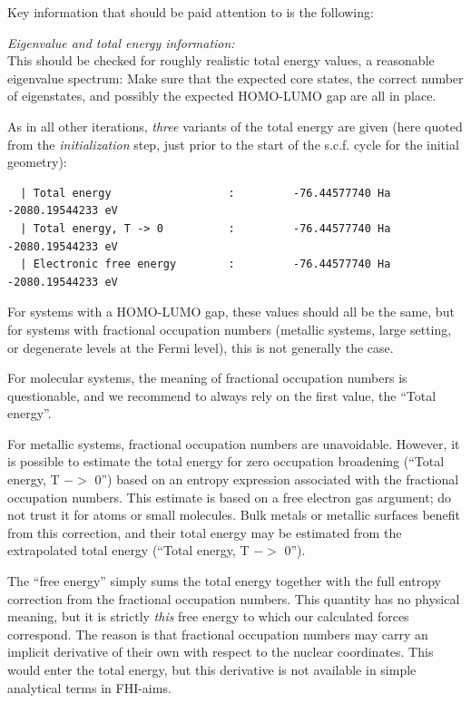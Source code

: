 Key information that should be paid attention to is the following:

\emph{Eigenvalue and total energy information:} \\
This should be checked for roughly realistic total energy values, a
reasonable eigenvalue spectrum: Make sure that the expected core
states, the correct number of eigenstates, and possibly the expected
HOMO-LUMO gap are all in place.

As in all other iterations, \emph{three} variants of the total energy
are given (here quoted from the \emph{initialization} step, just prior to the
start of the s.c.f. cycle for the initial geometry):
{\small
\begin{verbatim}
  | Total energy                  :         -76.44577740 Ha       -2080.19544233 eV
  | Total energy, T -> 0          :         -76.44577740 Ha       -2080.19544233 eV
  | Electronic free energy        :         -76.44577740 Ha       -2080.19544233 eV
\end{verbatim}
}
For systems with a HOMO-LUMO gap, these values should all be the same,
but for systems with fractional occupation numbers (metallic systems,
large  setting, or degenerate levels at the
Fermi level), this is not generally the case.

For molecular systems, the meaning of fractional occupation numbers is
questionable, and we recommend to always rely on the first value, the
``Total energy''.

For metallic systems, fractional occupation numbers are
unavoidable. However, it is possible to estimate the total energy for
zero occupation broadening (``Total energy, T $->$ 0'') based on an
entropy expression associated with the fractional occupation
numbers. This estimate is based on a free electron gas argument; do not trust
it for atoms or small molecules. Bulk metals or metallic
surfaces benefit from this correction, and their total energy may be
estimated from the extrapolated total energy (``Total energy, T $->$
0'').

The ``free energy'' simply sums the total energy together
with the full entropy correction from the fractional occupation
numbers. This quantity has no physical meaning, but it is strictly
\emph{this} free energy to which our calculated forces correspond. The
reason is that fractional occupation numbers may carry an implicit
derivative of their own with respect to the nuclear coordinates. This
would enter the total energy, but this derivative is not available in
simple analytical terms in FHI-aims. 


